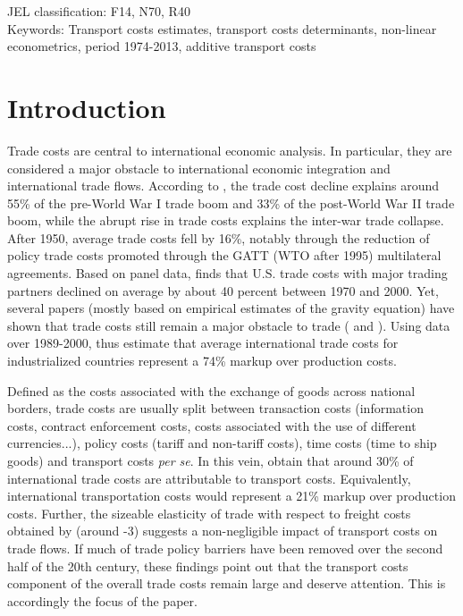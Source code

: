 \documentclass[a4paper,11pt]{article}
\begin{document}
\thispagestyle{empty} \pagestyle{plain} \setcounter{page}{1}



{\normalsize JEL classification: F14, N70, R40 \\
Keywords: Transport costs estimates, transport costs determinants, non-linear econometrics, period 1974-2013, additive transport costs }

{\normalsize \vspace{0cm} }

{\normalsize \titlepage }

{\normalsize \newpage }


\section{Introduction}



\noindent Trade costs are central to international economic analysis. In particular, they are considered a major obstacle to international economic integration and international trade flows. According to \cite{Jacks08}, the trade cost decline explains around 55\% of the pre-World War I trade boom and 33\% of the post-World War II trade boom, while the abrupt rise in trade costs explains the inter-war trade collapse. After 1950, average trade costs fell by 16\%, notably through the reduction of policy trade costs promoted through the GATT (WTO after 1995) multilateral agreements. Based on panel data, \citet{novy13} finds  that U.S. trade costs with major trading partners declined on average by about 40 percent between 1970 and 2000. Yet, several papers (mostly based on empirical estimates of the gravity equation) have shown that trade costs still remain a major obstacle to trade (\citealp{Head_Mayer04} and \citealp{Disdier_Head08}). Using data over 1989-2000, \citet{anderson_wincoop_jel} thus estimate that average international trade costs for industrialized countries represent a 74\% markup over production costs.

Defined as the costs associated with the exchange of goods across national borders, trade costs are usually split between transaction costs (information costs, contract enforcement costs, costs associated with the use of different currencies...), policy costs (tariff  and non-tariff costs), time costs (time to ship goods) and transport costs \emph{per se}. In this vein, \citet{anderson_wincoop_jel} obtain that around 30\% of international trade costs are attributable to transport costs. Equivalently, international transportation costs would represent a 21\% markup over production costs. Further, the sizeable elasticity of trade with respect to freight costs obtained by \cite{Behar_Venables} (around -3) suggests a non-negligible impact of transport costs on trade flows. If much of trade policy barriers have been removed over the second half of the 20th century, these findings point out that the transport costs component of the overall trade costs remain large and deserve attention. This is accordingly the focus of the paper.\smallskip
\end{document}
